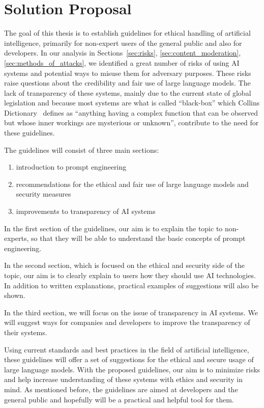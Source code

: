 \chapter{Solution Proposal}

The goal of this thesis is to establish guidelines for ethical handling of artificial intelligence, primarily for non-expert users of the general public and also for developers. In our analysis in Sections~\ref{sec:risks}, \ref{sec:content_moderation}, \ref{sec:methods_of_attacks}, we identified a great number of risks of using AI systems and potential ways to misuse them for adversary purposes. These risks raise questions about the credibility and fair use of large language models. The lack of transparency of these systems, mainly due to the current state of global legislation and because most systems are what is called ``black-box'' which Collins Dictionary~\cite{Collins_BlackBox} defines as ``anything having a complex function that can be observed but whose inner workings are mysterious or unknown'', contribute to the need for these guidelines.

The guidelines will consist of three main sections:
\begin{enumerate}
    \item introduction to prompt engineering
    \item recommendations for the ethical and fair use of large language models and security measures
    \item improvements to transparency of AI systems %
\end{enumerate}

In the first section of the guidelines, our aim is to explain the topic to non-experts, so that they will be able to understand the basic concepts of prompt engineering.

In the second section, which is focused on the ethical and security side of the topic, our aim is to clearly explain to users how they should use AI technologies. In addition to written explanations, practical examples of suggestions will also be shown.

In the third section, we will focus on the issue of transparency in AI systems. We will suggest ways for companies and developers to improve the transparency of their systems.

Using current standards and best practices in the field of artificial intelligence, these guidelines will offer a set of suggestions for the ethical and secure usage of large language models. With the proposed guidelines, our aim is to minimize risks and help increase understanding of these systems with ethics and security in mind. As mentioned before, the guidelines are aimed at developers and the general public and hopefully will be a practical and helpful tool for them.
